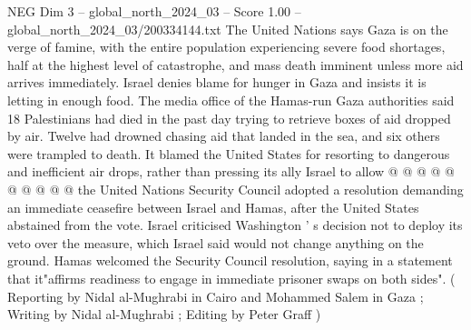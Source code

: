 \begin{textsample}{NEG Dim 3 – global\_north\_2024\_03 – Score 1.00 – global\_north\_2024\_03/200334144.txt}
The United Nations says Gaza is on the verge of famine, with the entire population experiencing severe food shortages, half at the highest level of catastrophe, and mass death imminent unless more aid arrives immediately.
Israel denies blame for hunger in Gaza and insists it is letting in enough food.
The media office of the Hamas-run Gaza authorities said 18 Palestinians had died in the past day trying to retrieve boxes of aid dropped by air.
Twelve had drowned chasing aid that landed in the sea, and six others were trampled to death.
It blamed the United States for resorting to dangerous and inefficient air drops, rather than pressing its ally Israel to allow @ @ @ @ @ @ @ @ @ @ the United Nations Security Council adopted a resolution demanding an immediate ceasefire between Israel and Hamas, after the United States abstained from the vote.
Israel criticised Washington ' s decision not to deploy its veto over the measure, which Israel said would not change anything on the ground.
Hamas welcomed the Security Council resolution, saying in a statement that it"affirms readiness to engage in immediate prisoner swaps on both sides". ( Reporting by Nidal al-Mughrabi in Cairo and Mohammed Salem in Gaza ; Writing by Nidal al-Mughrabi ; Editing by Peter Graff )

\end{textsample}
